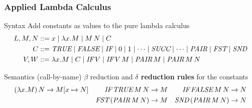 \documentclass[pdftex,aspectratio=169]{beamer}
\begin{document}
\begin{frame}[fragile]
  \frametitle{Applied Lambda Calculus}
  \begin{block}{Syntax}
    Add constants as values to the pure lambda calculus
    \begin{align*}
      L, M, N &::= x \mid \lambda x.M \mid M\, N \mid C\\
      C    &::= \TRUE \mid \FALSE \mid \IF 
           \mid 0 \mid 1 \mid \dots \mid \SUCC \mid \dots 
           \mid \PAIR \mid \FST \mid \SND \\
      V,W  &::=  \lambda x.M \mid C
           \mid \IF\,V \mid  \IF\,V\,M %
           \mid \PAIR\, M \mid \PAIR\, M\, N
    \end{align*}
  \end{block}
  \begin{block}{Semantics (call-by-name)}
    $\beta$ reduction and \textbf{$\delta$ reduction rules} for the constants
    \begin{align*}
      (\lambda x.M)\,N \rightarrow M[x \mapsto N]
      &&
      \textit{IF}\,\textit{TRUE}\,M\,N \rightarrow M
      &&
      \textit{IF}\,\textit{FALSE}\,M\,N \rightarrow N
      \\
      &&
      \textit{FST}\,(\textit{PAIR}\,M\,N) \rightarrow M
      &&
      \textit{SND}\,(\textit{PAIR}\,M\,N) \rightarrow N
    \end{align*}
  \end{block}
\end{frame}             
\end{document}
